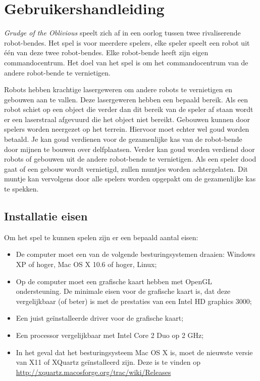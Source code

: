     \section{Gebruikershandleiding}
    \label{app:handleiding}
    \emph{Grudge of the Oblivious} speelt zich af in een oorlog tussen twee rivaliserende robot-bendes. Het spel is voor meerdere spelers, elke speler speelt een robot uit \'e\'en van deze twee robot-bendes. Elke robot-bende heeft zijn eigen commandocentrum. Het doel van het spel is om het commandocentrum van de andere robot-bende te vernietigen.

    Robots hebben krachtige lasergeweren om andere robots te vernietigen en gebouwen aan te vallen. Deze lasergeweren hebben een bepaald bereik. Als een robot schiet op een object die verder dan dit bereik van de speler af staan wordt er een laserstraal afgevuurd die het object niet bereikt. Gebouwen kunnen door spelers worden neergezet op het terrein. Hiervoor moet echter wel goud worden betaald. Je kan goud verdienen voor de gezamenlijke kas van de robot-bende door mijnen te bouwen over delfplaatsen. Verder kan goud worden verdiend door robots of gebouwen uit de andere robot-bende te vernietigen. Als een speler dood gaat of een gebouw wordt vernietigd, zullen muntjes worden achtergelaten. Dit muntje kan vervolgens door alle spelers worden opgepakt om de gezamenlijke kas te spekken.

	\subsection{Installatie eisen}
	Om het spel te kunnen spelen zijn er een bepaald aantal eisen:
	\begin{itemize}
		\item De computer moet een van de volgende besturingsystemen draaien: Windows XP of hoger, Mac OS X 10.6 of hoger, Linux;
		\item Op de computer moet een grafische kaart hebben met OpenGL ondersteuning.  De minimale eisen voor de grafische kaart is, dat deze vergelijkbaar (of beter) is met de prestaties van een Intel HD graphics 3000;
		\item Een juist ge\"installeerde driver voor de grafische kaart;
		\item Een processor vergelijkbaar met Intel Core 2 Duo op 2 GHz;
		\item In het geval dat het besturingsysteem Mac OS X is, moet de nieuwste versie van X11 of XQuartz ge\"installeerd zijn. Deze is te vinden op \url{http://xquartz.macosforge.org/trac/wiki/Releases}
	\end{itemize}

